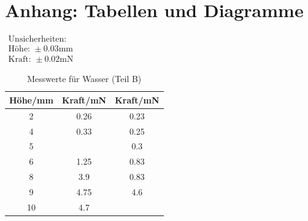 \documentclass[11pt,a4paper]{article}
\begin{document}
\pagebreak

\section{Anhang: Tabellen und Diagramme}

\begin{table}[h]
\centering
\caption{Messwerte für Wasser (Teil B)} \vspace{11pt}
$\begin{array}{l}
\textrm{Unsicherheiten:}\\
\textrm{Höhe: } \pm 0.03 \textrm{mm}\\
\textrm{Kraft: } \pm 0.02 \textrm{mN}
\end{array}$
\begin{tabular}{ccc}
\toprule
\textrm{H\"ohe}/\textrm{mm}& \textrm{Kraft}/\textrm{mN} & \textrm{Kraft}/\textrm{mN} \\
\midrule 
2 & 0.26 & 0.23\\
\hline
4 & 0.33 & 0.25\\
\hline 
5 & & 0.3\\
\hline 
6 & 1.25 & 0.83\\
\hline 
8 & 3.9 & 0.83\\ 
\hline
9 & 4.75 & 4.6\\ 
\hline
10 & 4.7 &\\ 
\bottomrule
\end{tabular}
\label{tabmw}
\end{table}
\end{document}
